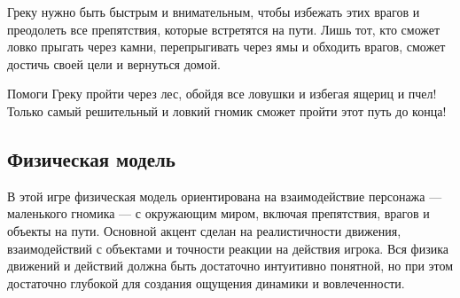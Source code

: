 \documentclass{article}
\begin{document}
Греку нужно быть быстрым и внимательным, чтобы избежать этих врагов и преодолеть все препятствия, которые встретятся на пути. Лишь тот, кто сможет ловко прыгать через камни, перепрыгивать через ямы и обходить врагов, сможет достичь своей цели и вернуться домой.

Помоги Греку пройти через лес, обойдя все ловушки и избегая ящериц и пчел! Только самый решительный и ловкий гномик сможет пройти этот путь до конца!

\subsection{Физическая модель}
В этой игре физическая модель ориентирована на взаимодействие персонажа — маленького гномика — с окружающим миром, включая препятствия, врагов и объекты на пути. Основной акцент сделан на реалистичности движения, взаимодействий с объектами и точности реакции на действия игрока. Вся физика движений и действий должна быть достаточно интуитивно понятной, но при этом достаточно глубокой для создания ощущения динамики и вовлеченности.
\end{document}
